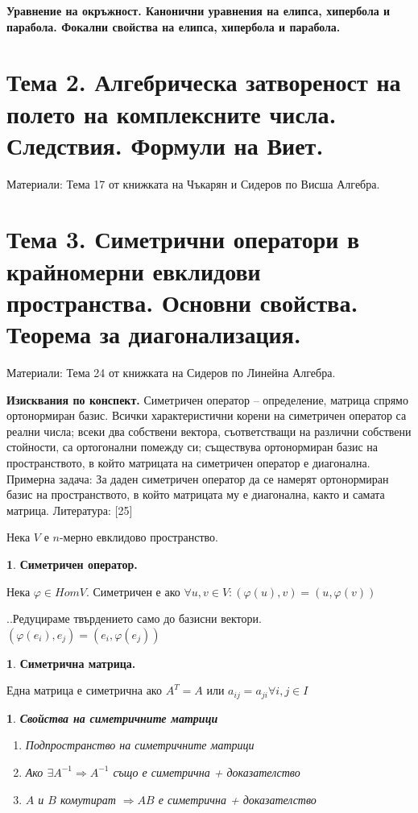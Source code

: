 \documentclass[11pt]{article}
\numberwithin{equation}{section}
\numberwithin{figure}{section}
\numberwithin{table}{section}
\theoremstyle{plain}
\theoremstyle{definition}
\newtheorem{defn}[thm]{\protect\definitionname}
\theoremstyle{remark}
\theoremstyle{definition}
\theoremstyle{remark}
\theoremstyle{plain}
\theoremstyle{definition}
\theoremstyle{definition}
\theoremstyle{plain}
\theoremstyle{plain}
\newtheorem{prop}[thm]{\protect\propositionname}
\theoremstyle{plain}
\theoremstyle{definition}
\theoremstyle{plain}
\providecommand{\definitionname}{Дефиниция}
\providecommand{\propositionname}{Твърдение}
\begin{document}
\textbf{Уравнение на окръжност. Канонични уравнения на елипса, хипербола и парабола. Фокални свойства на елипса, хипербола и парабола.}

\section{Тема 2. Алгебрическа затвореност на полето на комплексните числа. Следствия. Формули на Виет.}

Материали: Тема 17 от книжката на Чъкарян и Сидеров по Висша Алгебра.

\section{Тема 3. Симетрични оператори в крайномерни евклидови пространства. Основни свойства. Теорема за
диагонализация.}

Материали: Тема 24 от книжката на Сидеров по Линейна Алгебра.

\hrulefill

\textbf{Изисквания по конспект.} Симетричен оператор – определение, матрица спрямо ортонормиран базис. Всички характеристични
корени на симетричен оператор са реални числа; всеки два собствени вектора, съответстващи на различни
собствени стойности, са ортогонални помежду си; съществува ортонормиран базис на пространството, в който
матрицата на симетричен оператор е диагонална.
Примерна задача: За даден симетричен оператор да се намерят ортонормиран базис на пространството,
в който матрицата му е диагонална, както и самата матрица.
Литература: [25]

\hrulefill

Нека $V$ е $n$-мерно евклидово пространство.


\begin{defn}
\textbf{Симетричен оператор.}

Нека $\varphi \in HomV$. Симетричен е ако $\forall u,v \in V : (\varphi(u),v) = (u,\varphi(v))$
\end{defn}

..Редуцираме твърдението само до базисни вектори. $(\varphi(e_i),e_j) = (e_i,\varphi(e_j))$


\begin{defn}
\textbf{Симетрична матрица.}

Една матрица е симетрична ако $A^T = A$ или $a_{ij} = a_{ji} \forall i,j \in I$
\end{defn}

\begin{prop}
\textbf{Свойства на симетричните матрици}
\begin{enumerate}
\item Подпространство на симетричните матрици
\item Ако $\exists A^{-1} \Rightarrow A^{-1}$ също е симетрична + доказателство
\item $A$ и $B$ комутират $\Rightarrow AB$ е симетрична + доказателство
\end{enumerate}
\end{prop}
\end{document}
